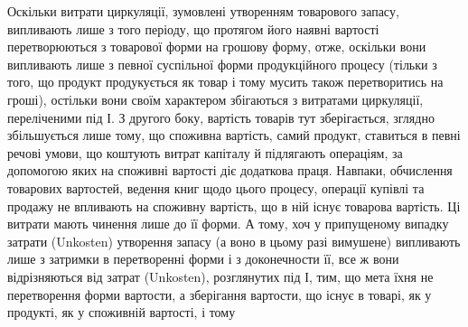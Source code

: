 Оскільки витрати циркуляції, зумовлені утворенням товарового запасу,
випливають лише з того періоду, що протягом його наявні вартості
перетворюються з товарової форми на грошову форму, отже, оскільки
вони випливають лише з певної суспільної форми продукційного процесу
(тільки з того, що продукт продукується як товар і тому мусить також
перетворитись на гроші), остільки вони своїм характером збігаються з витратами
циркуляції, переліченими під І. З другого боку, вартість товарів тут зберігається,
зглядно збільшується лише тому, що споживна вартість, самий
продукт, ставиться в певні речові умови, що коштують витрат капіталу й
підлягають операціям, за допомогою яких на споживні вартості діє
додаткова праця. Навпаки, обчислення товарових вартостей, ведення книг
щодо цього процесу, операції купівлі та продажу не впливають на споживну
вартість, що в ній існує товарова вартість. Ці витрати мають
чинення лише до її форми. А тому, хоч у припущеному випадку
затрати (Unkosten) утворення запасу (а воно в цьому разі вимушене)
випливають лише з затримки в перетворенні форми і з доконечности її,
все ж вони відрізняються від затрат (Unkosten), розглянутих під І, тим,
що мета їхня не перетворення форми вартости, а зберігання вартости,
що існує в товарі, як у продукті, як у споживній вартості, і тому
\parbreak{}  %
